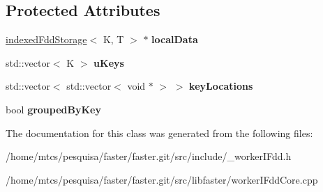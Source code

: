 \subsection*{Protected Attributes}
\begin{DoxyCompactItemize}
\item 
\hypertarget{classfaster_1_1workerIFddCore_a6bd0d4cb57e817b78276c1442bc74441}{}\hyperlink{classfaster_1_1indexedFddStorage}{indexed\+Fdd\+Storage}$<$ K, T $>$ $\ast$ {\bfseries local\+Data}\label{classfaster_1_1workerIFddCore_a6bd0d4cb57e817b78276c1442bc74441}

\item 
\hypertarget{classfaster_1_1workerIFddCore_a2b45bf1e4561a0622ad33cc8ddab6618}{}std\+::vector$<$ K $>$ {\bfseries u\+Keys}\label{classfaster_1_1workerIFddCore_a2b45bf1e4561a0622ad33cc8ddab6618}

\item 
\hypertarget{classfaster_1_1workerIFddCore_a0aae335b6c84d8927e04a486f9957ad1}{}std\+::vector$<$ std\+::vector$<$ void $\ast$ $>$ $>$ {\bfseries key\+Locations}\label{classfaster_1_1workerIFddCore_a0aae335b6c84d8927e04a486f9957ad1}

\item 
\hypertarget{classfaster_1_1workerIFddCore_a6545ef59d553976a05da0c7790264fd1}{}bool {\bfseries grouped\+By\+Key}\label{classfaster_1_1workerIFddCore_a6545ef59d553976a05da0c7790264fd1}

\end{DoxyCompactItemize}


The documentation for this class was generated from the following files\+:\begin{DoxyCompactItemize}
\item 
/home/mtcs/pesquisa/faster/faster.\+git/src/include/\+\_\+worker\+I\+Fdd.\+h\item 
/home/mtcs/pesquisa/faster/faster.\+git/src/libfaster/worker\+I\+Fdd\+Core.\+cpp\end{DoxyCompactItemize}

